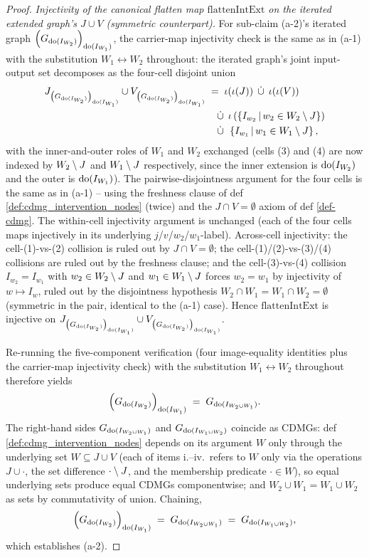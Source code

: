 \documentclass[main]{subfiles}
\providecommand{\flattenIntExt}{\mathrm{flattenIntExt}}
\begin{document}
\begin{proof}
\medskip\noindent\emph{Injectivity of the canonical flatten map $\flattenIntExt$ on the iterated extended graph's $J \cup V$ (symmetric counterpart).}
For sub-claim (a-2)'s iterated graph $\left ( G_{\operatorname{do}(I_{W_2})} \right )_{\operatorname{do}(I_{W_1})}$, the carrier-map injectivity check is the same as in (a-1) with the substitution $W_1 \leftrightarrow W_2$ throughout: the iterated graph's joint input-output set decomposes as the four-cell disjoint union
\begin{align*}
    J_{\left ( G_{\operatorname{do}(I_{W_2})} \right )_{\operatorname{do}(I_{W_1})}} \cup V_{\left ( G_{\operatorname{do}(I_{W_2})} \right )_{\operatorname{do}(I_{W_1})}}
        &\;=\; \iota(\iota(J)) \;\,\dot{\cup}\,\; \iota(\iota(V)) \\
        &\quad\,\dot{\cup}\,\; \iota\left (\left \{ I_{w_2} \,\middle|\, w_2 \in W_2 \setminus J \right \}\right ) \\
        &\quad\,\dot{\cup}\,\; \left \{ I_{w_1} \,\middle|\, w_1 \in W_1 \setminus J \right \},
\end{align*}
with the inner-and-outer roles of $W_1$ and $W_2$ exchanged (cells (3) and (4) are now indexed by $W_2 \setminus J$ and $W_1 \setminus J$ respectively, since the inner extension is $\operatorname{do}(I_{W_2})$ and the outer is $\operatorname{do}(I_{W_1})$). The pairwise-disjointness argument for the four cells is the same as in (a-1) -- using the freshness clause of def \ref{def:cdmg_intervention_nodes} (twice) and the $J \cap V = \emptyset$ axiom of def \ref{def-cdmg}. The within-cell injectivity argument is unchanged (each of the four cells maps injectively in its underlying $j$/$v$/$w_2$/$w_1$-label). Across-cell injectivity: the cell-(1)-vs-(2) collision is ruled out by $J \cap V = \emptyset$; the cell-(1)/(2)-vs-(3)/(4) collisions are ruled out by the freshness clause; and the cell-(3)-vs-(4) collision $I_{w_2} = I_{w_1}$ with $w_2 \in W_2 \setminus J$ and $w_1 \in W_1 \setminus J$ forces $w_2 = w_1$ by injectivity of $w \mapsto I_w$, ruled out by the disjointness hypothesis $W_2 \cap W_1 = W_1 \cap W_2 = \emptyset$ (symmetric in the pair, identical to the (a-1) case). Hence $\flattenIntExt$ is injective on $J_{\left ( G_{\operatorname{do}(I_{W_2})} \right )_{\operatorname{do}(I_{W_1})}} \cup V_{\left ( G_{\operatorname{do}(I_{W_2})} \right )_{\operatorname{do}(I_{W_1})}}$. \checkmark

\medskip
Re-running the five-component verification (four image-equality identities plus the carrier-map injectivity check) with the substitution $W_1 \leftrightarrow W_2$ throughout therefore yields
\[
    \left ( G_{\operatorname{do}(I_{W_2})} \right )_{\operatorname{do}(I_{W_1})} \;=\; G_{\operatorname{do}(I_{W_2 \cup W_1})}.
\]
The right-hand sides $G_{\operatorname{do}(I_{W_2 \cup W_1})}$ and $G_{\operatorname{do}(I_{W_1 \cup W_2})}$ coincide as CDMGs: def \ref{def:cdmg_intervention_nodes} depends on its argument $W$ only through the underlying set $W \subseteq J \cup V$ (each of items i.--iv.\ refers to $W$ only via the operations $J \cup \cdot$, the set difference $\cdot \setminus J$, and the membership predicate $\cdot \in W$), so equal underlying sets produce equal CDMGs componentwise; and $W_2 \cup W_1 = W_1 \cup W_2$ as sets by commutativity of union. Chaining,
\[
    \left ( G_{\operatorname{do}(I_{W_2})} \right )_{\operatorname{do}(I_{W_1})} \;=\; G_{\operatorname{do}(I_{W_2 \cup W_1})} \;=\; G_{\operatorname{do}(I_{W_1 \cup W_2})},
\]
which establishes (a-2).


\end{proof}
\end{document}
